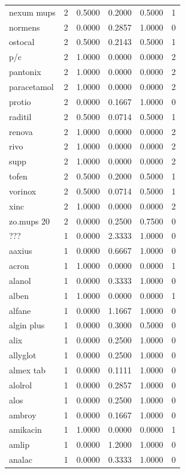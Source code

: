 \begin{longtable}{p{3.0cm}rrrrr}
nexum mups & 2 & 0.5000 & 0.2000 & 0.5000 & 1 \\
normens & 2 & 0.0000 & 0.2857 & 1.0000 & 0 \\
ostocal & 2 & 0.5000 & 0.2143 & 0.5000 & 1 \\
p/c & 2 & 1.0000 & 0.0000 & 0.0000 & 2 \\
pantonix & 2 & 1.0000 & 0.0000 & 0.0000 & 2 \\
paracetamol & 2 & 1.0000 & 0.0000 & 0.0000 & 2 \\
protio & 2 & 0.0000 & 0.1667 & 1.0000 & 0 \\
raditil & 2 & 0.5000 & 0.0714 & 0.5000 & 1 \\
renova & 2 & 1.0000 & 0.0000 & 0.0000 & 2 \\
rivo & 2 & 1.0000 & 0.0000 & 0.0000 & 2 \\
supp & 2 & 1.0000 & 0.0000 & 0.0000 & 2 \\
tofen & 2 & 0.5000 & 0.2000 & 0.5000 & 1 \\
vorinox & 2 & 0.5000 & 0.0714 & 0.5000 & 1 \\
xinc & 2 & 1.0000 & 0.0000 & 0.0000 & 2 \\
zo.mups 20 & 2 & 0.0000 & 0.2500 & 0.7500 & 0 \\
??? & 1 & 0.0000 & 2.3333 & 1.0000 & 0 \\
aaxius & 1 & 0.0000 & 0.6667 & 1.0000 & 0 \\
acron & 1 & 1.0000 & 0.0000 & 0.0000 & 1 \\
alanol & 1 & 0.0000 & 0.3333 & 1.0000 & 0 \\
alben & 1 & 1.0000 & 0.0000 & 0.0000 & 1 \\
alfane & 1 & 0.0000 & 1.1667 & 1.0000 & 0 \\
algin plus & 1 & 0.0000 & 0.3000 & 0.5000 & 0 \\
alix & 1 & 0.0000 & 0.2500 & 1.0000 & 0 \\
allyglot & 1 & 0.0000 & 0.2500 & 1.0000 & 0 \\
almex tab & 1 & 0.0000 & 0.1111 & 1.0000 & 0 \\
alolrol & 1 & 0.0000 & 0.2857 & 1.0000 & 0 \\
alos & 1 & 0.0000 & 0.2500 & 1.0000 & 0 \\
ambroy & 1 & 0.0000 & 0.1667 & 1.0000 & 0 \\
amikacin & 1 & 1.0000 & 0.0000 & 0.0000 & 1 \\
amlip & 1 & 0.0000 & 1.2000 & 1.0000 & 0 \\
analac & 1 & 0.0000 & 0.3333 & 1.0000 & 0 \\

\end{longtable}
